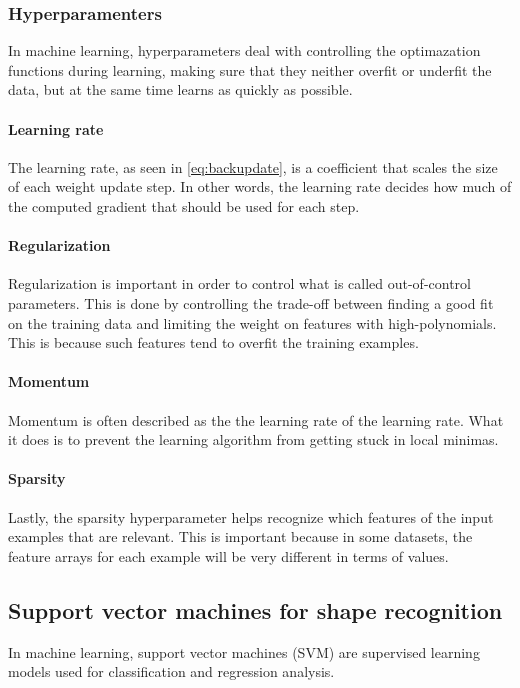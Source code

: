 \subsubsection{Hyperparamenters}\label{section:hyperparameters}
In machine learning, hyperparameters deal with controlling the optimazation functions during learning, making sure that they neither overfit or underfit the data, but at the same time learns as quickly as possible.

\paragraph{Learning rate}
The learning rate, as seen in \autoref{eq:backupdate}, is a coefficient that scales the size of each weight update step. In other words, the learning rate decides how much of the computed gradient that should be used for each step. 

\paragraph{Regularization}
Regularization is important in order to control what is called out-of-control parameters. This is done by controlling the trade-off between finding a good fit on the training data and limiting the weight on features with high-polynomials. This is because such features tend to overfit the training examples.

\paragraph{Momentum}
Momentum is often described as the the learning rate of the learning rate. What it does is to prevent the learning algorithm from getting stuck in local minimas.

\paragraph{Sparsity}
Lastly, the sparsity hyperparameter helps recognize which features of the input examples that are relevant. This is important because in some datasets, the feature arrays for each example will be very different in terms of values.


\subsection{Support vector machines for shape recognition}\label{section:svm}
In machine learning, support vector machines (SVM) are supervised learning models used for classification and regression analysis. 

